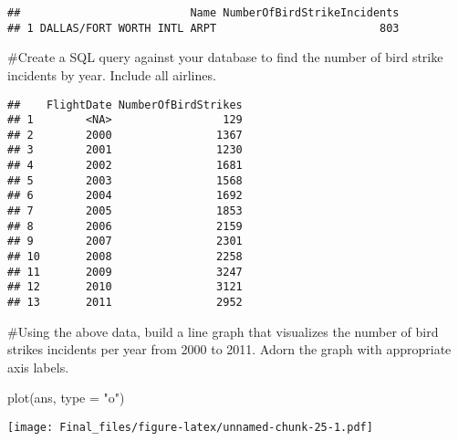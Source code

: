 \documentclass[
]{article}
\newenvironment{Shaded}{\begin{snugshade}}{\end{snugshade}}
\newcommand{\AttributeTok}[1]{\textcolor[rgb]{0.77,0.63,0.00}{#1}}
\newcommand{\DecValTok}[1]{\textcolor[rgb]{0.00,0.00,0.81}{#1}}
\newcommand{\FunctionTok}[1]{\textcolor[rgb]{0.00,0.00,0.00}{#1}}
\newcommand{\NormalTok}[1]{#1}
\newcommand{\OtherTok}[1]{\textcolor[rgb]{0.56,0.35,0.01}{#1}}
\newcommand{\SpecialCharTok}[1]{\textcolor[rgb]{0.00,0.00,0.00}{#1}}
\newcommand{\StringTok}[1]{\textcolor[rgb]{0.31,0.60,0.02}{#1}}
\begin{document}
\begin{verbatim}
##                          Name NumberOfBirdStrikeIncidents
## 1 DALLAS/FORT WORTH INTL ARPT                         803
\end{verbatim}

\#Create a SQL query against your database to find the number of bird
strike incidents by year. Include all airlines.

\begin{Shaded}
\end{Shaded}

\begin{verbatim}
##    FlightDate NumberOfBirdStrikes
## 1        <NA>                 129
## 2        2000                1367
## 3        2001                1230
## 4        2002                1681
## 5        2003                1568
## 6        2004                1692
## 7        2005                1853
## 8        2006                2159
## 9        2007                2301
## 10       2008                2258
## 11       2009                3247
## 12       2010                3121
## 13       2011                2952
\end{verbatim}

\#Using the above data, build a line graph that visualizes the number of
bird strikes incidents per year from 2000 to 2011. Adorn the graph with
appropriate axis labels.

\begin{Shaded}
\begin{Highlighting}[]
\FunctionTok{plot}\NormalTok{(ans, }\AttributeTok{type =} \StringTok{"o"}\NormalTok{)}
\end{Highlighting}
\end{Shaded}

\texttt{[image: Final\_files/figure-latex/unnamed-chunk-25-1.pdf]}
\end{document}
